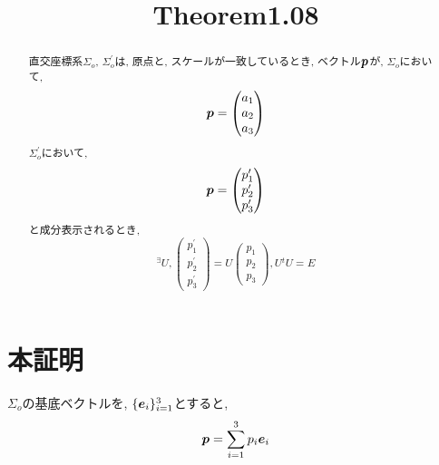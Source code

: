 \documentclass{jsarticle}
\title{Theorem1.08}
\newcommand*{\mbold}[1]{\mbox{\boldmath $#1$}}
\begin{document}
\maketitle

\begin{abstract}
  直交座標系$\Sigma_{o}$, $\Sigma^\prime_{o}$は, 原点と, スケールが一致しているとき, 
  ベクトル$\mbold{p}$が, 
  $\Sigma_{o}$において, 
  \[
    \mbold{p}
    =
    \begin{pmatrix}
      a_1 \\
      a_2 \\
      a_3
    \end{pmatrix}
  \]
  $\Sigma^\prime_{o}$において, 
  \[
    \mbold{p}
    =
    \begin{pmatrix}
      p^\prime_1 \\
      p^\prime_2 \\
      p^\prime_3
    \end{pmatrix}
  \]
  と成分表示されるとき, 
  \begin{equation}
    {}^\exists U, 
    \begin{pmatrix}
      p^\prime_1 \\
      p^\prime_2 \\
      p^\prime_3
    \end{pmatrix}
    = U
    \begin{pmatrix}
      p_1 \\
      p_2 \\
      p_3
    \end{pmatrix}
    ,
    U{}^t U = E
  \end{equation}
\end{abstract}

\section*{本証明}
$\Sigma_{o}$の基底ベクトルを, $\{ \mbold{e}_i \}_{i = 1}^{3}$とすると, 
\begin{equation}
  \mbold{p} = \sum_{i = 1}^3 p_i \mbold{e}_i
\end{equation}
\end{document}
